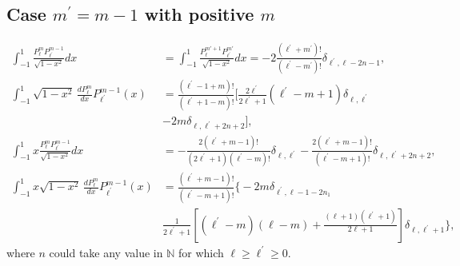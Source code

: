 \subsection{Case $m^{\prime}= m - 1$ with positive $m$}
\begin{align}
    \int_{-1}^{1} \frac{P_{\ell}^{m} P_{\ell^{\prime}}^{m-1}}{\sqrt{1-x^2}} dx &= \int_{-1}^{1} \frac{P_{\ell}^{m'+1} P_{\ell^{\prime}}^{m'}}{\sqrt{1-x^2}} dx = -2\frac{(\ell^{\prime}+m^{\prime})!}{(\ell^{\prime}-m^{\prime})!} \delta_{\ell^{\prime}, \ell - 2n -1},\\
    \int_{-1}^{1} \sqrt{1-x^2} \,\frac{dP_{\ell}^{m}}{dx} P_{\ell^{\prime}}^{m-1} (x) &= \frac{(\ell^{\prime}-1+m)!}{(\ell^{\prime}+1-m)!}\Big[\frac{2\ell^{\prime}}{2\ell^{\prime}+1}(\ell^{\prime}-m+1)\delta_{\ell,\ell^{\prime}} \nonumber\\
    &-2m \delta_{\ell,\ell^{\prime}+2n+2}\Big],\\
    \int_{-1}^{1} x \frac{P_{\ell}^{m} P_{\ell^{\prime}}^{m-1}}{\sqrt{1-x^2}} dx &=  -\frac{2(\ell^{\prime}+m-1)!}{(2\ell^{\prime}+1)(\ell^{\prime}-m)!}\delta_{\ell,\ell^{\prime}}-\frac{2(\ell^{\prime}+m-1)!}{(\ell^{\prime}-m+1)!}\delta_{\ell,\ell^{\prime}+2n+2},\\
    \int_{-1}^{1} x\sqrt{1-x^2} \,\frac{dP_{\ell}^{m}}{dx} P_{\ell^{\prime}}^{m-1} (x) &= \frac{(\ell^{\prime}+m-1)!}{(\ell^{\prime}-m+1)!} \Big\{ -2m \delta_{\ell^{\prime},\ell-1-2n_1} \nonumber \\
    & \frac{1}{2\ell^{\prime}+1}\left[(\ell^{\prime}-m)(\ell-m)+\frac{(\ell+1)(\ell^{\prime}+1)}{2\ell+1}\right] \delta_{\ell,\ell^{\prime}+1} \Big\},
\end{align}
where $n$ could take any value in $\mathbb{N}$ for which $\ell \geq \ell^{\prime} \geq 0$.
